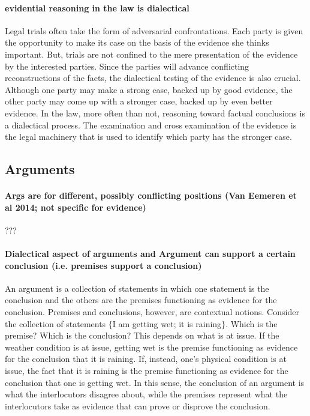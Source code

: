 \documentclass[10pt]{article}
\begin{document}
\paragraph{evidential reasoning in the law is dialectical} 

Legal trials often take the form of adversarial confrontations.  Each party is given the opportunity to make its case on the basis of the evidence she thinks important. But, 
trials are not confined to the mere presentation of the 
evidence by the interested parties. Since the parties will advance conflicting reconstructions of the facts, 
the dialectical testing of the evidence is also crucial. 
Although one party may make a strong case, backed up by good evidence, %
the other party may come up with a stronger case, backed up by even better evidence.  In the law, more often than not, reasoning toward factual 
conclusions is a dialectical process. The examination and cross examination of the evidence 
is the legal machinery that is used to identify which party has the stronger case.

\subsection{Arguments}


\paragraph{Args are for different, possibly conflicting positions (Van Eemeren et al 2014; not specific for evidence)}

???

\paragraph{Dialectical aspect of arguments and Argument can support a certain conclusion (i.e. premises support a conclusion)}

An argument is a collection of statements in which one statement is the conclusion and 
the others are the premises functioning as evidence for the conclusion. 
Premises and conclusions, however, are contextual notions. Consider the collection of statements $\{$I am getting wet; it is raining$\}$. Which is the premise? Which is the conclusion? 
This depends on what is at issue. If the weather condition is at issue, getting wet is the premise functioning as evidence for the conclusion 
that it is raining. If, instead, one's physical condition is at issue, the fact that it 
is raining is the premise functioning as evidence for the conclusion that one is getting wet. In this sense, the conclusion of an argument 
is what the interlocutors disagree about, while the premises 
represent what the interlocutors take as evidence that can prove or disprove the conclusion. 
\end{document}
